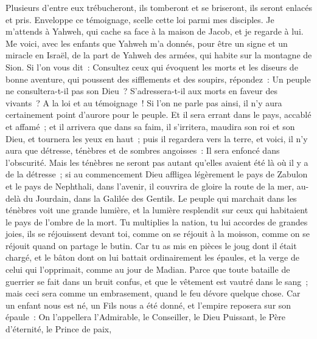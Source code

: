 \begin{multicols}{2}
Plusieurs d'entre eux trébucheront, ils tomberont et se briseront, ils seront enlacés et pris.
Enveloppe ce témoignage, scelle cette loi parmi mes disciples.
Je m'attends à Yahweh, qui cache sa face à la maison de Jacob, et je regarde à lui.
Me voici, avec les enfants que Yahweh m'a donnés, pour être un signe et un miracle en Israël, de la part de Yahweh des armées, qui habite sur la montagne de Sion.
Si l'on vous dit~: Consultez ceux qui évoquent les morts et les diseurs de bonne aventure, qui poussent des sifflements et des soupirs, répondez~: Un peuple ne consultera-t-il pas son Dieu~? S'adressera-t-il aux morts en faveur des vivants~?
A la loi et au témoignage~! Si l'on ne parle pas ainsi, il n'y aura certainement point d'aurore pour le peuple.
Et il sera errant dans le pays, accablé et affamé~; et il arrivera que dans sa faim, il s'irritera, maudira son roi et son Dieu, et tournera les yeux en haut~;
puis il regardera vers la terre, et voici, il n'y aura que détresse, ténèbres et de sombres angoisses~: Il sera enfoncé dans l'obscurité.
Mais les ténèbres ne seront pas autant qu'elles avaient été là où il y a de la détresse~; si au commencement Dieu affligea légèrement le pays de Zabulon et le pays de Nephthali, dans l'avenir, il couvrira de gloire la route de la mer, au-delà du Jourdain, dans la Galilée des Gentils.
\VerseOne{}Le peuple qui marchait dans les ténèbres voit une grande lumière, et la lumière resplendit sur ceux qui habitaient le pays de l'ombre de la mort.
Tu multiplies la nation, tu lui accordes de grandes joies, ils se réjouissent devant toi, comme on se réjouit à la moisson, comme on se réjouit quand on partage le butin.
Car tu as mis en pièces le joug dont il était chargé, et le bâton dont on lui battait ordinairement les épaules, et la verge de celui qui l'opprimait, comme au jour de Madian.
Parce que toute bataille de guerrier se fait dans un bruit confus, et que le vêtement est vautré dans le sang~; mais ceci sera comme un embrasement, quand le feu dévore quelque chose.
Car un enfant nous est né, un Fils nous a été donné, et l'empire reposera sur son épaule~: On l'appellera l'Admirable, le Conseiller, le Dieu Puissant, le Père d'éternité, le Prince de paix,

\end{multicols}
